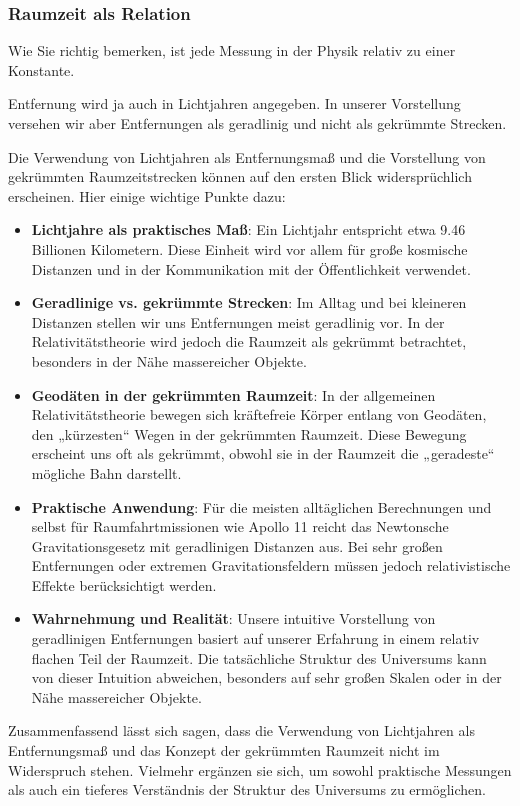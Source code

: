 \documentclass[a4paper,12pt]{article}
\begin{document}
	\subsubsection{Raumzeit als Relation}
	Wie Sie richtig bemerken, ist jede Messung in der Physik relativ zu einer Konstante.
	
	Entfernung wird ja auch in Lichtjahren angegeben. In unserer Vorstellung versehen wir aber Entfernungen als geradlinig und nicht als gekrümmte Strecken.
	
	Die Verwendung von Lichtjahren als Entfernungsmaß und die Vorstellung von gekrümmten Raumzeitstrecken können auf den ersten Blick widersprüchlich erscheinen. Hier einige wichtige Punkte dazu:
	\begin{itemize}
		\item \textbf{Lichtjahre als praktisches Maß}: Ein Lichtjahr entspricht etwa 9.46 Billionen Kilometern. Diese Einheit wird vor allem für große kosmische Distanzen und in der Kommunikation mit der Öffentlichkeit verwendet.
		\item \textbf{Geradlinige vs. gekrümmte Strecken}: Im Alltag und bei kleineren Distanzen stellen wir uns Entfernungen meist geradlinig vor. In der Relativitätstheorie wird jedoch die Raumzeit als gekrümmt betrachtet, besonders in der Nähe massereicher Objekte.
		\item \textbf{Geodäten in der gekrümmten Raumzeit}: In der allgemeinen Relativitätstheorie bewegen sich kräftefreie Körper entlang von Geodäten, den „kürzesten“ Wegen in der gekrümmten Raumzeit. Diese Bewegung erscheint uns oft als gekrümmt, obwohl sie in der Raumzeit die „geradeste“ mögliche Bahn darstellt.
		\item \textbf{Praktische Anwendung}: Für die meisten alltäglichen Berechnungen und selbst für Raumfahrtmissionen wie Apollo 11 reicht das Newtonsche Gravitationsgesetz mit geradlinigen Distanzen aus. Bei sehr großen Entfernungen oder extremen Gravitationsfeldern müssen jedoch relativistische Effekte berücksichtigt werden.
		\item \textbf{Wahrnehmung und Realität}: Unsere intuitive Vorstellung von geradlinigen Entfernungen basiert auf unserer Erfahrung in einem relativ flachen Teil der Raumzeit. Die tatsächliche Struktur des Universums kann von dieser Intuition abweichen, besonders auf sehr großen Skalen oder in der Nähe massereicher Objekte.
	\end{itemize}
	Zusammenfassend lässt sich sagen, dass die Verwendung von Lichtjahren als Entfernungsmaß und das Konzept der gekrümmten Raumzeit nicht im Widerspruch stehen. Vielmehr ergänzen sie sich, um sowohl praktische Messungen als auch ein tieferes Verständnis der Struktur des Universums zu ermöglichen.
	
\end{document}
